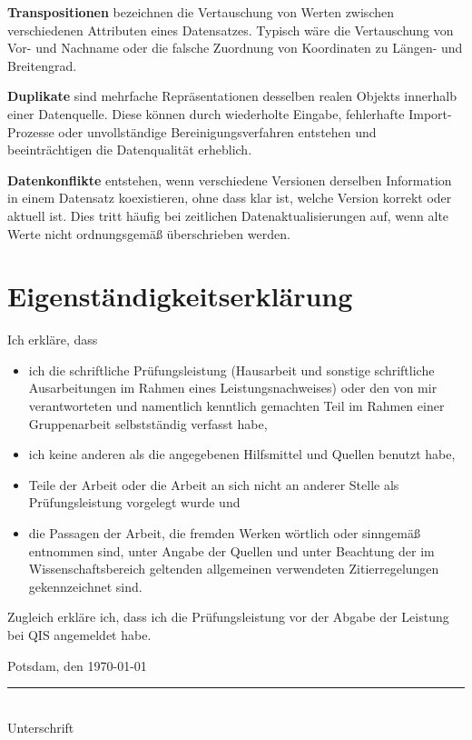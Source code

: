 \documentclass[
    a4paper,
    12pt,
    headinclude=true,
    BCOR=10mm,
]{scrreprt}
\begin{document}
\textbf{Transpositionen} bezeichnen die Vertauschung von Werten zwischen verschiedenen Attributen eines Datensatzes. Typisch wäre die Vertauschung von Vor- und Nachname oder die falsche Zuordnung von Koordinaten zu Längen- und Breitengrad.

\textbf{Duplikate} sind mehrfache Repräsentationen desselben realen Objekts innerhalb einer Datenquelle. Diese können durch wiederholte Eingabe, fehlerhafte Import-Prozesse oder unvollständige Bereinigungsverfahren entstehen und beeinträchtigen die Datenqualität erheblich.

\textbf{Datenkonflikte} entstehen, wenn verschiedene Versionen derselben Information in einem Datensatz koexistieren, ohne dass klar ist, welche Version korrekt oder aktuell ist. Dies tritt häufig bei zeitlichen Datenaktualisierungen auf, wenn alte Werte nicht ordnungsgemäß überschrieben werden.



\newpage
{}
\chapter*{Eigenständigkeitserklärung}
Ich erkläre, dass
\begin{itemize}
    \item ich die schriftliche Prüfungsleistung (Hausarbeit und sonstige schriftliche Ausarbeitungen im Rahmen eines Leistungsnachweises) oder den von mir verantworteten und namentlich kenntlich gemachten Teil im Rahmen einer Gruppenarbeit selbstständig verfasst habe,
    \item ich keine anderen als die angegebenen Hilfsmittel und Quellen benutzt habe,
    \item Teile der Arbeit oder die Arbeit an sich nicht an anderer Stelle als Prüfungsleistung vorgelegt wurde und
    \item die Passagen der Arbeit, die fremden Werken wörtlich oder sinngemäß entnommen sind, unter Angabe der Quellen und unter Beachtung der im Wissenschaftsbereich geltenden allgemeinen verwendeten Zitierregelungen gekennzeichnet sind.
\end{itemize}

Zugleich erkläre ich, dass ich die Prüfungsleistung vor der Abgabe der Leistung bei QIS angemeldet habe.

\vspace{2cm}

\noindent
Potsdam, den \today

\vspace{2cm}

\noindent
\rule{6cm}{0.4pt}\\
Unterschrift

\printbibliography
\newpage
\appendix
\end{document}
